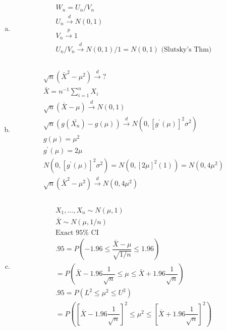 \documentclass{article}
\newcommand{\cd}{\overset{d}{\to}}
\newcommand{\cp}{\overset{p}{\to}}
\begin{document}
\begin{flushleft}
\begin{enumerate}[(a)]
	\item 
\begin{multline*}\\
W_n=U_n/V_n\\
U_n\cd N(0,1)\\
V_n\cp 1\\
U_n/V_n \cd N(0,1)/1=N(0,1) \text{ (Slutsky's Thm)}\\
\end{multline*}

	\item 
\begin{multline*}\\
\sqrt{n}(\bar{X}^2-\mu^2)\cd ?\\
\bar{X}=n^{-1}\sum_{i=1}^{n}X_i\\
\sqrt{n}(\bar{X}-\mu) \cd N(0,1)\\
\sqrt{n}(g(\bar{X_n})-g(\mu))\cd N(0,[g^{'}(\mu)]^2\sigma^2)\\
g(\mu)=\mu^2\\
g^{'}(\mu)=2\mu\\
N(0,[g^{'}(\mu)]^2\sigma^2)=N(0,[2\mu]^2(1))=N(0,4\mu^2)\\
\sqrt{n}(\bar{X}^2-\mu^2)\cd N(0,4\mu^2)\\
\end{multline*}

	\item 
\begin{multline*}\\X_1,\dots,X_n \sim N(\mu,1)\\
\bar{X}\sim N(\mu,1/n)\\
\text{Exact } 95\% \text{ CI}\\
.95=P\left(-1.96\leq\dfrac{\bar{X}-\mu}{\sqrt{1/n}}\leq 1.96 \right)\\
=P\left(\bar{X}-1.96\dfrac{1}{\sqrt{n}}\leq \mu\leq \bar{X}+1.96\dfrac{1}{\sqrt{n}} \right)\\
.95=P\left(L^2\leq \mu^2 \leq U^2 \right)\\
=P\left( \left[ \bar{X}-1.96\dfrac{1}{\sqrt{n}}\right]^2\leq \mu^2 \leq \left[ \bar{X}+1.96\dfrac{1}{\sqrt{n}}\right]^2 \right)\\
\end{multline*}	
\end{enumerate}

\end{flushleft}
\end{document}
